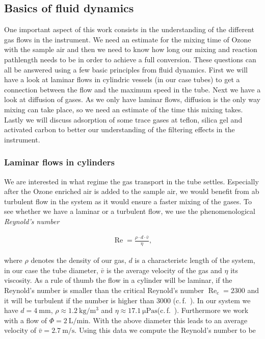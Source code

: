 \subsection{Basics of fluid dynamics}
\label{sec:fluid}

One important aspect of this work consists in the understanding of the
different gas flows in the instrument. We need an estimate for the
mixing time of Ozone with the sample air and then we need to know how
long our mixing and reaction pathlength needs to be in order to
achieve a full conversion. These questions can all be answered using a
few basic principles from fluid dynamics. First we will have a look at
laminar flows in cylindric vessels (in our case tubes) to get a
connection between the flow and the maximum speed in the tube. Next we
have a look at diffusion of gases. As we only have laminar flows,
diffusion is the only way mixing can take place, so we need an
estimate of the time this mixing takes. Lastly we will discuss
adsorption of some trace gases at teflon, silica gel and activated
carbon to better our understanding of the filtering effects in the
instrument. 

\subsubsection{Laminar flows in cylinders}
\label{sec:cylinder}

We are interested in what regime the gas transport in the tube
settles. Especially after the Ozone enriched air is added to the
sample air, we would benefit from ab turbulent flow in the system as
it would ensure a faster mixing of the gases. To see whether we have
a laminar or a turbulent flow, we use the phenomenological \emph{Reynold's
number}

\begin{align*}
  \operatorname{Re} = \frac{\rho \cdot d \cdot \bar v}{\eta},
\end{align*}

where $\rho$ denotes the density of our gas, $d$ is a characteristc
length of the system, in our case the tube diameter, $\bar v$ is the
average velocity of the gas and $\eta$ its viscosity. As a rule of
thumb the flow in a cylinder will be laminar, if the Reynold's number
is smaller than the critical Reynold's number
$\operatorname{Re}_{\text{c}} = 2300$ and it will be turbulent if the
number is higher than $3000$ (c.\,f.~\cite{maschbau}). In our system
we have $d = \SI{4}{\milli\meter}$, $\rho \approx
\SI{1.2}{\kilo\gram\per\cubic\meter}$ and $\eta \approx
\SI{17.1}{\micro\pascal\second}$(c.\,f.~\cite{maschbau}). Furthermore
we work with a flow of $\Phi = \SI{2}{\liter\per\minute}$. With the
above diameter this leads to an average velocity of $\bar v =
\SI{2.7}{\meter\per\second}$. Using this data we compute the Reynold's
number to be

